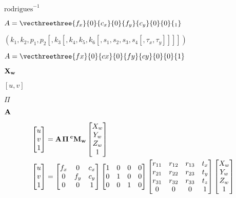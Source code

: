 \documentclass{article}
\begin{document}
$\mathrm{rodrigues}^{-1}$
\pagebreak

$A = \vecthreethree{f_x}{0}{c_x}{0}{f_y}{c_y}{0}{0}{_1}$
\pagebreak

$(k_1, k_2, p_1, p_2[, k_3[, k_4, k_5, k_6 [, s_1, s_2, s_3, s_4[, \tau_x, \tau_y]]]])$
\pagebreak

$A = \vecthreethree{fx}{0}{cx}{0}{fy}{cy}{0}{0}{1}$
\pagebreak

$ \bf{X}_w $
\pagebreak

$ \left[ u, v \right] $
\pagebreak

$ \Pi $
\pagebreak

$ \bf{A} $
\pagebreak

\[ \begin{align*} \begin{bmatrix} u \\ v \\ 1 \end{bmatrix} &= \bf{A} \hspace{0.1em} \Pi \hspace{0.2em} ^{c}\bf{M}_w \begin{bmatrix} X_{w} \\ Y_{w} \\ Z_{w} \\ 1 \end{bmatrix} \\ \begin{bmatrix} u \\ v \\ 1 \end{bmatrix} &= \begin{bmatrix} f_x & 0 & c_x \\ 0 & f_y & c_y \\ 0 & 0 & 1 \end{bmatrix} \begin{bmatrix} 1 & 0 & 0 & 0 \\ 0 & 1 & 0 & 0 \\ 0 & 0 & 1 & 0 \end{bmatrix} \begin{bmatrix} r_{11} & r_{12} & r_{13} & t_x \\ r_{21} & r_{22} & r_{23} & t_y \\ r_{31} & r_{32} & r_{33} & t_z \\ 0 & 0 & 0 & 1 \end{bmatrix} \begin{bmatrix} X_{w} \\ Y_{w} \\ Z_{w} \\ 1 \end{bmatrix} \end{align*} \]
\pagebreak
\end{document}
